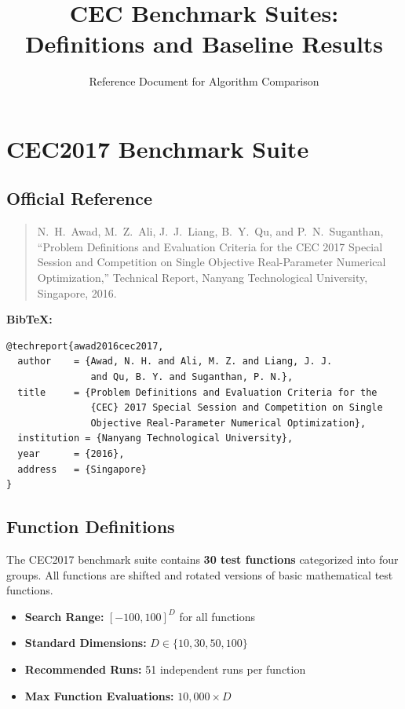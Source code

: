 \documentclass[11pt]{article}
\title{CEC Benchmark Suites: Definitions and Baseline Results}
\author{Reference Document for Algorithm Comparison}
\date{}
\begin{document}
\maketitle

\section{CEC2017 Benchmark Suite}

\subsection{Official Reference}

\begin{quote}
N.~H.~Awad, M.~Z.~Ali, J.~J.~Liang, B.~Y.~Qu, and P.~N.~Suganthan, 
``Problem Definitions and Evaluation Criteria for the CEC 2017 Special Session and Competition on Single Objective Real-Parameter Numerical Optimization,'' 
Technical Report, Nanyang Technological University, Singapore, 2016.
\end{quote}

\noindent\textbf{BibTeX:}
\begin{verbatim}
@techreport{awad2016cec2017,
  author    = {Awad, N. H. and Ali, M. Z. and Liang, J. J. 
               and Qu, B. Y. and Suganthan, P. N.},
  title     = {Problem Definitions and Evaluation Criteria for the 
               {CEC} 2017 Special Session and Competition on Single 
               Objective Real-Parameter Numerical Optimization},
  institution = {Nanyang Technological University},
  year      = {2016},
  address   = {Singapore}
}
\end{verbatim}

\subsection{Function Definitions}

The CEC2017 benchmark suite contains \textbf{30 test functions} categorized into four groups. 
All functions are shifted and rotated versions of basic mathematical test functions.

\begin{itemize}
    \item \textbf{Search Range:} $[-100, 100]^D$ for all functions
    \item \textbf{Standard Dimensions:} $D \in \{10, 30, 50, 100\}$
    \item \textbf{Recommended Runs:} 51 independent runs per function
    \item \textbf{Max Function Evaluations:} $10{,}000 \times D$
\end{itemize}
\end{document}
